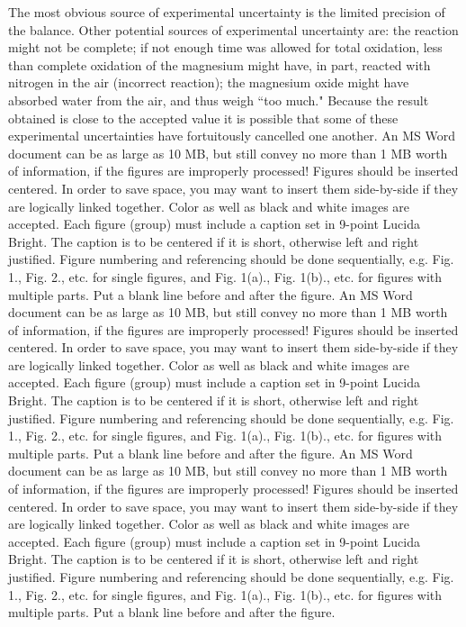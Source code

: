 \documentclass[9pt,a4paper]{article}
\begin{document}
The most obvious source of experimental uncertainty is the limited precision of the balance. Other potential sources of experimental uncertainty are: the reaction might not be complete; if not enough time was allowed for total oxidation, less than complete oxidation of the magnesium might have, in part, reacted with nitrogen in the air (incorrect reaction); the magnesium oxide might have absorbed water from the air, and thus weigh ``too much." Because the result obtained is close to the accepted value it is possible that some of these experimental uncertainties have fortuitously cancelled one another.
An MS Word document can be as large as 10 MB, but still convey no more than 1 MB worth of information, if the figures are improperly processed! Figures should be inserted centered. In order to save space, you may want to insert them side-by-side if they are logically linked together. Color as well as black and white images are accepted. Each figure (group) must include a caption set in 9-point Lucida Bright. The caption is to be centered if it is short, otherwise left and right justified. Figure numbering and referencing should be done sequentially, e.g. Fig. 1., Fig. 2., etc. for single figures, and Fig. 1(a)., Fig. 1(b)., etc. for figures with multiple parts. Put a blank line before and after the figure.
An MS Word document can be as large as 10 MB, but still convey no more than 1 MB worth of information, if the figures are improperly processed! Figures should be inserted centered. In order to save space, you may want to insert them side-by-side if they are logically linked together. Color as well as black and white images are accepted. Each figure (group) must include a caption set in 9-point Lucida Bright. The caption is to be centered if it is short, otherwise left and right justified. Figure numbering and referencing should be done sequentially, e.g. Fig. 1., Fig. 2., etc. for single figures, and Fig. 1(a)., Fig. 1(b)., etc. for figures with multiple parts. Put a blank line before and after the figure.
An MS Word document can be as large as 10 MB, but still convey no more than 1 MB worth of information, if the figures are improperly processed! Figures should be inserted centered. In order to save space, you may want to insert them side-by-side if they are logically linked together. Color as well as black and white images are accepted. Each figure (group) must include a caption set in 9-point Lucida Bright. The caption is to be centered if it is short, otherwise left and right justified. Figure numbering and referencing should be done sequentially, e.g. Fig. 1., Fig. 2., etc. for single figures, and Fig. 1(a)., Fig. 1(b)., etc. for figures with multiple parts. Put a blank line before and after the figure.
\end{document}
